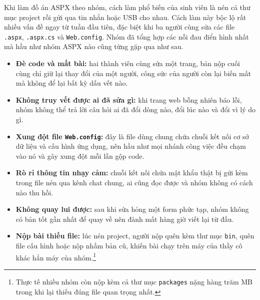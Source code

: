 Khi làm đồ án ASPX theo nhóm, cách làm phổ biến của sinh viên là nén cả thư mục project rồi gửi qua tin nhắn hoặc USB cho nhau.
Cách làm này bộc lộ rất nhiều vấn đề ngay từ tuần đầu tiên, đặc biệt khi ba người cùng sửa các file \texttt{.aspx}, \texttt{.aspx.cs} và \texttt{Web.config}.
Nhóm đã tổng hợp các nỗi đau điển hình nhất mà hầu như nhóm ASPX nào cũng từng gặp qua như sau.
\begin{itemize}
\item \textbf{Đè code và mất bài:} hai thành viên cùng sửa một trang, bản nộp cuối cùng chỉ giữ lại thay đổi của một người, công sức của người còn lại biến mất mà không để lại bất kỳ dấu vết nào.
\item \textbf{Không truy vết được ai đã sửa gì:} khi trang web bỗng nhiên báo lỗi, nhóm không thể trả lời câu hỏi ai đã đổi dòng nào, đổi lúc nào và đổi vì lý do gì.
\item \textbf{Xung đột file \texttt{Web.config}:} đây là file dùng chung chứa chuỗi kết nối cơ sở dữ liệu và cấu hình ứng dụng, nên hầu như mọi nhánh công việc đều chạm vào nó và gây xung đột mỗi lần gộp code.
\item \textbf{Rò rỉ thông tin nhạy cảm:} chuỗi kết nối chứa mật khẩu thật bị gửi kèm trong file nén qua kênh chat chung, ai cũng đọc được và nhóm không có cách nào thu hồi.
\item \textbf{Không quay lui được:} sau khi sửa hỏng một form phức tạp, nhóm không có bản tốt gần nhất để quay về nên đành mất hàng giờ viết lại từ đầu.
\item \textbf{Nộp bài thiếu file:} lúc nén project, người nộp quên kèm thư mục \texttt{bin}, quên file cấu hình hoặc nộp nhầm bản cũ, khiến bài chạy trên máy của thầy cô khác hẳn máy của nhóm.\footnote{Thực tế nhiều nhóm còn nộp kèm cả thư mục \texttt{packages} nặng hàng trăm MB trong khi lại thiếu đúng file quan trọng nhất.}
\end{itemize}

